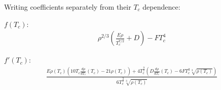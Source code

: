 Writing coefficients separately from their $T_c$ dependence:

$f(T_c):$
\begin{align*}
    \rho^{2/3}\left(\frac{E\rho}{T_c^{7/2}}+D\right)-FT_c^4
\end{align*}

$f'(T_c):$
\begin{align*}
    \frac{E \rho\left(T_{c}\right) \left(10T_{c} \frac{d\rho}{dT_c}\left(T_{c}\right) - 21 \rho\left(T_{c}\right)\right) + 4T_{c}^{\frac{9}{2}} \left(D \frac{d\rho}{dT_c}\left(T_{c}\right) - 6FT_{c}^{3} \sqrt[3]{\rho\left(T_{c}\right)}\right)}{6T_{c}^{\frac{9}{2}} \sqrt[3]{\rho\left(T_{c}\right)}}
\end{align*}
